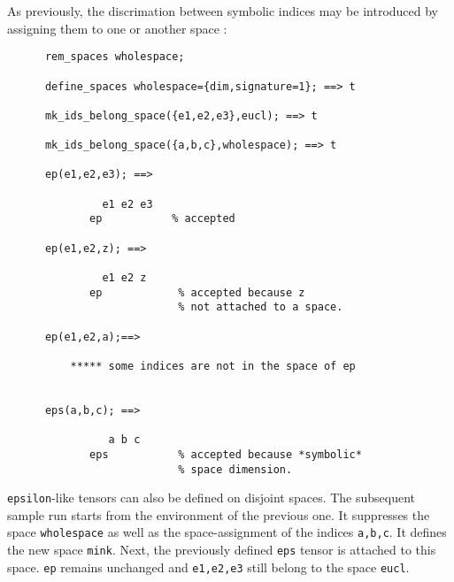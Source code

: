 As previously, the discrimation between symbolic indices 
%
may be introduced 
by assigning them to one or another space%
:
\begin{verbatim}
      rem_spaces wholespace;

      define_spaces wholespace={dim,signature=1}; ==> t

      mk_ids_belong_space({e1,e2,e3},eucl); ==> t

      mk_ids_belong_space({a,b,c},wholespace); ==> t

      ep(e1,e2,e3); ==>

               e1 e2 e3
             ep           % accepted

      ep(e1,e2,z); ==>

               e1 e2 z
             ep            % accepted because z
                           % not attached to a space.

      ep(e1,e2,a);==>

          ***** some indices are not in the space of ep


      eps(a,b,c); ==>

                a b c
             eps           % accepted because *symbolic*
                           % space dimension.
\end{verbatim}
\texttt{epsilon}-like tensors can also be defined on disjoint spaces. 
The subsequent sample run starts from the environment of the previous one.
It suppresses the space \texttt{wholespace} as well as the 
space-assignment of the indices \texttt{a,b,c}. It  defines the new space
\texttt{mink}. Next, the previously defined  \texttt{eps} tensor is attached 
to this space. \texttt{ep} remains unchanged and \texttt{e1,e2,e3} still
belong to the space \texttt{eucl}.  
